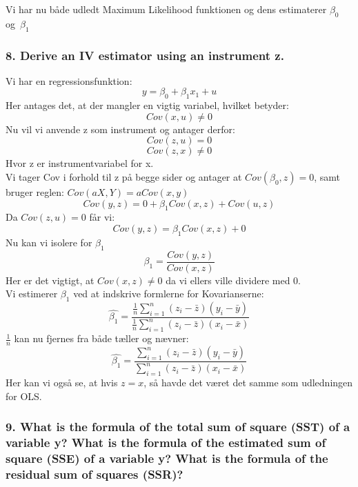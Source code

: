 \documentclass[
  10pt,
]{article}
\begin{document}
Vi har nu både udledt Maximum Likelihood funktionen og dens estimaterer
\(\beta_0\) og~\(\beta_1\) \newpage

\hypertarget{derive-an-iv-estimator-using-an-instrument-z.}{%
\subsubsection{8. Derive an IV estimator using an instrument
z.}\label{derive-an-iv-estimator-using-an-instrument-z.}}

Vi har en regressionsfunktion: \[y=\beta_0+\beta_1x_1+u \] Her antages
det, at der mangler en vigtig variabel, hvilket betyder:
\[Cov(x,u)\neq0\] Nu vil vi anvende z som instrument og antager derfor:
\[ Cov(z,u)=0\] \[ Cov(z,x)\neq0\] Hvor z er instrumentvariabel for x.\\
Vi tager Cov i forhold til z på begge sider og antager at
\(Cov(\beta_0,z)=0\), samt bruger reglen: \(Cov(aX,Y)=aCov(x,y)\)\\
\[ Cov(y,z)=0+\beta_1Cov(x,z)+Cov(u,z)\] Da \(Cov(z,u)=0\) får vi:
\[ Cov(y,z)=\beta_1Cov(x,z)+0\] Nu kan vi isolere for \(\beta_1\)
\[\beta_1=\frac{Cov(y,z)}{Cov(x,z)} \] Her er det vigtigt, at
\(Cov(x,z)\neq0\) da vi ellers ville dividere med 0.\\
Vi estimerer \(\beta_1\) ved at indskrive formlerne for Kovarianserne:
\[\hat{\beta_1}= \frac{\tfrac{1}{n}\sum\limits_{i=1}^n (z_i-\bar{z})(y_i-\bar{y})}{\tfrac{1}{n}\sum\limits_{i=1}^n (z_i-\bar{z})(x_i-\bar{x})} \]
\(\frac{1}{n}\) kan nu fjernes fra både tæller og nævner:
\[\hat{\beta_1}= \frac{\sum\limits_{i=1}^n (z_i-\bar{z})(y_i-\bar{y})}{\sum\limits_{i=1}^n (z_i-\bar{z})(x_i-\bar{x})} \]
Her kan vi også se, at hvis \(z=x\), så havde det været det samme som
udledningen for OLS. \newpage



\hypertarget{what-is-the-formula-of-the-total-sum-of-square-sst-of-a-variable-y-what-is-the-formula-of-the-estimated-sum-of-square-sse-of-a-variable-y-what-is-the-formula-of-the-residual-sum-of-squares-ssr}{%
\subsubsection{9. What is the formula of the total sum of square (SST)
of a variable y? What is the formula of the estimated sum of square
(SSE) of a variable y? What is the formula of the residual sum of
squares
(SSR)?}\label{what-is-the-formula-of-the-total-sum-of-square-sst-of-a-variable-y-what-is-the-formula-of-the-estimated-sum-of-square-sse-of-a-variable-y-what-is-the-formula-of-the-residual-sum-of-squares-ssr}}
\end{document}
